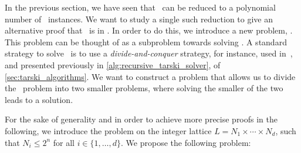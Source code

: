 In the previous section, we have seen that \Tarski\ can be reduced to a polynomial number of \Brouwer\ instances. We want to study a single such reduction to give an alternative proof that \Tarski\ is in \PPAD\@. In order to do this, we introduce a new problem, \Tarskistar. This problem can be thought of as a subproblem towards solving \Tarski. A standard strategy to solve \Tarski\ is to use a \emph{divide-and-conquer} strategy, for instance, used in~, and presented previously in \cref{alg:recursive_tarski_solver}, of \cref{sec:tarski_algorithms}. We want to construct a problem that allows us to divide the \Tarski\ problem into two smaller problems, where solving the smaller of the two leads to a solution.

For the sake of generality and in order to achieve more precise proofs in the following, we introduce the problem on the integer lattice $L = N_1 \times \cdots \times N_d$, such that $N_i \leq 2^n$ for all $i \in \{1, \dots, d\}$. We propose the following problem:

